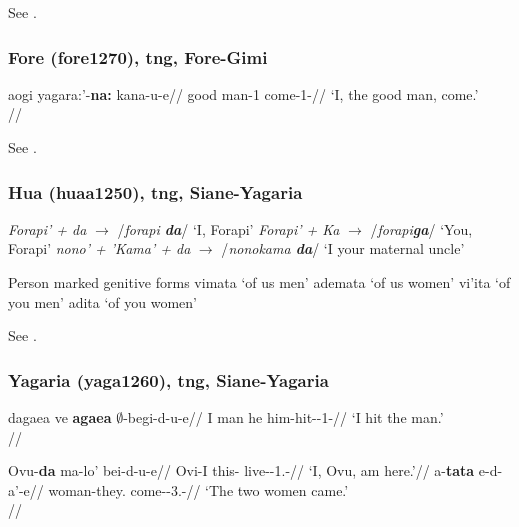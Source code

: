 \documentclass[A4paper]{article}
\begin{document}
See \citet[90--92, 96f.]{bruce1984}.

\subsubsection{Fore (fore1270), \gls{tng}, Fore-Gimi}


\ex
\begingl
\gla aogi yagara:'-\textbf{na:} kana-u-e//
\glb good man-1\Sg{} come-1\Sg-\Ind{}//
\glft `I, the good man, come.'\\{\citep[after][80]{scott1978}}//
\endgl
\xe

See \citet[79f., 100f.]{scott1978}.

\subsubsection{Hua (huaa1250), \gls{tng}, Siane-Yagaria}

\pex 
\a
\emph{Forapi' + da} $\rightarrow$ /\emph{forapi \textbf{da}}/ `I, Forapi'
\a
\emph{Forapi' + Ka} $\rightarrow$ /\emph{forapi\textbf{ga}}/ `You, Forapi'
\a
\emph{nono' + 'Kama' + da} $\rightarrow$ /\emph{nonokama \textbf{da}}/ `I your maternal uncle'\\{\citep[226]{haiman1980}}
\xe

\pex Person marked genitive forms{\citep[after][240]{haiman1980}}
\a vimata \newline`of us men'
\a ademata \newline `of us women'
\a vi'ita \newline `of you men'
\a adita \newline `of you women'
\xe

See \citet[226--232, 239f.]{haiman1980}.

\subsubsection{Yagaria (yaga1260), \gls{tng}, Siane-Yagaria}

\ex 
\begingl
\gla dagaea ve \textbf{agaea} $\emptyset$-begi-d-u-e//
\glb I man he him-hit-\Pst{}-1\Sg{}-\Ind{}//
\glft `I hit the man.' \\{\citep[18f.]{renck1975}}//
\endgl
\xe

\pex\a
\begingl
\gla Ovu-\textbf{da} ma-lo' bei-d-u-e//
\glb Ovi-I this-\Loc{} live-\Pst{}-1.\Sg{}-\Ind{}//
\glft `I, Ovu, am here.'//
\endgl
\a
\begingl
\gla a-\textbf{tata} e-d-a'-e//
\glb woman-they.\Du{}{} come-\Pst{}-3.\Du{}-\Ind{}//
\glft `The two women came.'\\{\citep[19]{renck1975}}//
\endgl
\xe
\end{document}
